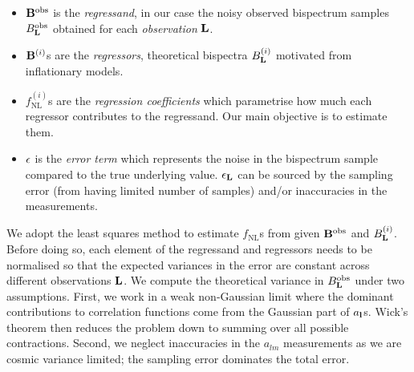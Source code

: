 \begin{itemize}
	\item $\mathbf{B}^\text{obs}$ is the \textit{regressand}, in our case the noisy observed bispectrum samples $B^\text{obs}_\mathbf{L}$ obtained for each \textit{observation} $\mathbf{L}$.
	\item $\mathbf{B}^{(i)}$s are the \textit{regressors}, theoretical bispectra $B^{(i)}_\mathbf{L}$ motivated from inflationary models.
	\item $f^{(i)}_\text{NL}$s are the \textit{regression coefficients} which parametrise how much each regressor contributes to the regressand. Our main objective is to estimate them.
	\item $\mathbf{\epsilon}$ is the \textit{error term} which represents the noise in the bispectrum sample compared to the true underlying value. $\epsilon_\mathbf{L}$ can be sourced by the sampling error (from having limited number of samples) and/or inaccuracies in the measurements. 
\end{itemize}

We adopt the least squares method to estimate $f_\text{NL}$s from given $\mathbf{B}^\text{obs}$ and $B^{(i)}_\mathbf{L}$. Before doing so, each element of the regressand and regressors needs to be normalised so that the expected variances in the error are constant across different observations $\mathbf{L}$. We compute the theoretical variance in $B^\text{obs}_\mathbf{L}$ under two assumptions. First, we work in a weak non-Gaussian limit where the dominant contributions to correlation functions come from the Gaussian part of $a_\mathbf{l}$s. Wick's theorem then reduces the problem down to summing over all possible contractions. Second, we neglect inaccuracies in the $a_{lm}$ measurements as we are cosmic variance limited; the sampling error dominates the total error.


